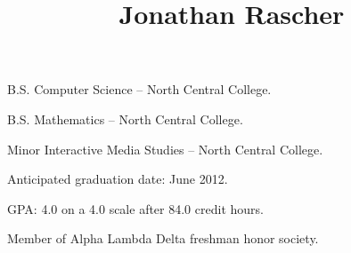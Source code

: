 \documentclass[12pt]{simplecv}
\begin{document}
  \leftheader{
    \contactemail \\
    \contactphone
  }

  \rightheader{
    \contactaddressone \\
    \contactaddresstwo
  }

  \title{Jonathan Rascher}
  \maketitle

  \begin{topic}
    \item[B.S.] Computer Science -- North Central College.

    \item[B.S.] Mathematics -- North Central College.

    \item[Minor] Interactive Media Studies -- North Central College.

    \item Anticipated graduation date: June 2012.

    \item GPA: 4.0 on a 4.0 scale after 84.0 credit hours.

    \item Member of Alpha Lambda Delta freshman honor society.
  \end{topic}
\end{document}
